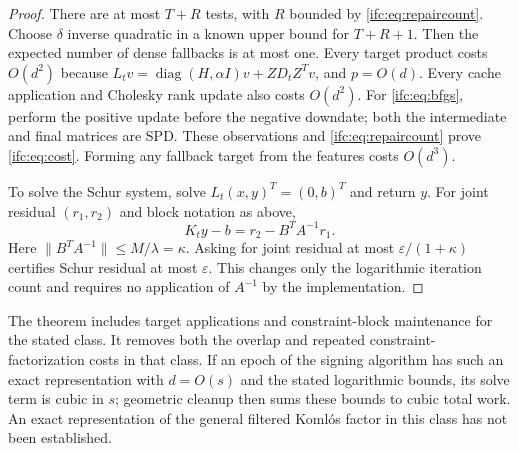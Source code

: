 \documentclass[11pt]{amsart}
\theoremstyle{definition}\newtheorem{definition}[theorem]{Definition}
\theoremstyle{remark}\newtheorem{remark}[theorem]{Remark}
\numberwithin{equation}{section}
\newcommand{\diag}{\operatorname{diag}}
\begin{document}
\begin{proof}
There are at most $T+R$ tests, with $R$ bounded by
\eqref{ifc:eq:repaircount}. Choose $\delta$ inverse quadratic in a
known upper bound for $T+R+1$. Then the expected number of dense
fallbacks is at most one. Every target product costs $O(d^2)$ because
$L_tv=\diag(H,\alpha I)v+ZD_tZ^Tv$, and $p=O(d)$.
Every cache application and Cholesky rank update also costs $O(d^2)$.
For \eqref{ifc:eq:bfgs}, perform the positive update before the negative
downdate; both the intermediate and final matrices are SPD.
These observations and \eqref{ifc:eq:repaircount} prove \eqref{ifc:eq:cost}.
Forming any fallback target from the features costs $O(d^3)$.

To solve the Schur system, solve $L_t(x,y)^T=(0,b)^T$ and return $y$.
For joint residual $(r_1,r_2)$ and block notation as above,
\[
 K_ty-b=r_2-B^TA^{-1}r_1.
\]
Here $\|B^TA^{-1}\|\le M/\lambda=\kappa$. Asking for joint
residual at most $\varepsilon/(1+\kappa)$ certifies Schur residual
at most $\varepsilon$. This changes only the logarithmic iteration
count and requires no application of $A^{-1}$ by the implementation.
\end{proof}

The theorem includes target applications and constraint-block maintenance
for the stated class.
It removes both the overlap and repeated constraint-factorization costs
in that class. If an epoch of the signing algorithm has such an exact
representation with $d=O(s)$ and the stated logarithmic bounds, its
solve term is cubic in $s$; geometric cleanup then sums these bounds to
cubic total work. An exact representation of the general filtered
Koml\'os factor in this class has not been established.
\end{document}
